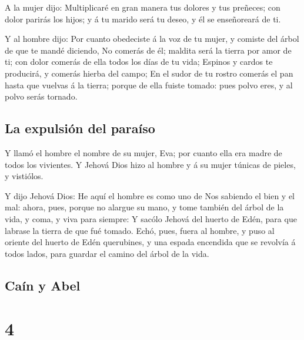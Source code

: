  A la mujer dijo: Multiplicaré en gran manera tus dolores
y tus preñeces; con dolor parirás los hijos; y á tu marido será tu
deseo, y él se enseñoreará de ti.

 Y al hombre dijo: Por cuanto obedeciste á la voz de tu
mujer, y comiste del árbol de que te mandé diciendo, No comerás de él;
maldita será la tierra por amor de ti; con dolor comerás de ella todos
los días de tu vida;  Espinos y cardos te producirá, y
comerás hierba del campo;  En el sudor de tu rostro
comerás el pan hasta que vuelvas á la tierra; porque de ella fuiste
tomado: pues polvo eres, y al polvo serás tornado.

\hypertarget{la-expulsiuxf3n-del-parauxedso}{%
\subsection{La expulsión del
paraíso}\label{la-expulsiuxf3n-del-parauxedso}}

 Y llamó el hombre el nombre de su mujer, Eva; por cuanto
ella era madre de todos los vivientes.  Y Jehová Dios
hizo al hombre y á su mujer túnicas de pieles, y vistiólos.

 Y dijo Jehová Dios: He aquí el hombre es como uno de Nos
sabiendo el bien y el mal: ahora, pues, porque no alargue su mano, y
tome también del árbol de la vida, y coma, y viva para siempre:
 Y sacólo Jehová del huerto de Edén, para que labrase la
tierra de que fué tomado.  Echó, pues, fuera al hombre, y
puso al oriente del huerto de Edén querubines, y una espada encendida
que se revolvía á todos lados, para guardar el camino del árbol de la
vida.

\hypertarget{cauxedn-y-abel}{%
\subsection{Caín y Abel}\label{cauxedn-y-abel}}

\hypertarget{section-3}{%
\section{4}\label{section-3}}

